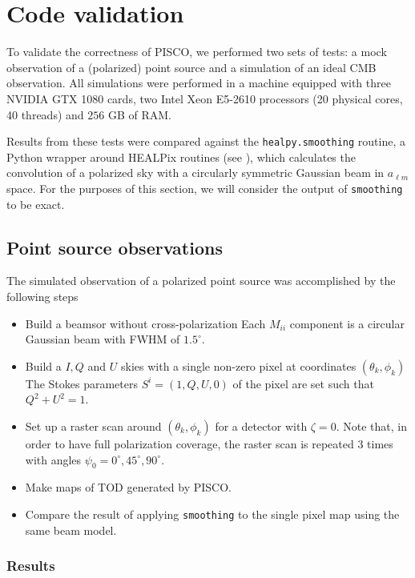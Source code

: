 \documentclass[a4paper,11pt]{article}
\begin{document}
%
\section{Code validation}
\label{sec::validation}

To validate the correctness of PISCO, we performed two sets of tests: a mock observation of a (polarized) point source and a simulation of an ideal CMB observation. All simulations were performed in a machine equipped with three NVIDIA GTX 1080 cards, two Intel Xeon E5-2610 processors (20 physical cores, 40 threads) and $256$ GB of RAM. 

Results from these tests were compared against the \texttt{healpy.smoothing} routine, a Python wrapper around HEALPix routines (see \cite{2005ApJ...622..759G}), which calculates the convolution of a polarized sky with a circularly symmetric Gaussian beam in $a_{\ell m}$ space. For the purposes of this section, we will consider the output of \texttt{smoothing} to be exact. 

\subsection{Point source observations}

The simulated observation of a polarized point source was accomplished by the following steps

\begin{itemize}
	\item Build a beamsor without cross-polarization Each $M_{ii}$ component is a circular Gaussian beam with FWHM of $1.5^\circ$.
	\item Build a $I,Q$ and $U$ skies with a single non-zero pixel at coordinates $(\theta_k,\phi_k)$ The Stokes parameters $S^{i} = (1,Q,U,0)$ of the pixel are set such that $Q^2 + U^2 = 1$.
	\item Set up a raster scan around $(\theta_k,\phi_k)$ for a detector with $\zeta=0$. Note that, in order to have full polarization coverage, the raster scan is repeated 3 times with angles $\psi_0 = 0^{\circ},45^{\circ},90^{\circ}$.
	\item Make maps of TOD generated by PISCO.
	\item Compare the result of applying \texttt{smoothing} to the single pixel map using the same beam model.
\end{itemize}

\subsubsection{Results}
\end{document}
